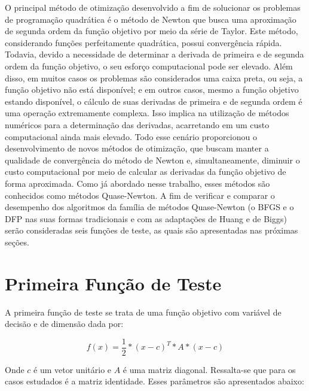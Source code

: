 O principal método de otimização desenvolvido a fim de solucionar os problemas de programação quadrática é o método de Newton que busca uma aproximação de segunda ordem da função objetivo por meio da série de Taylor. Este método, considerando funções perfeitamente quadrática, possui convergência rápida. Todavia, devido a necessidade de determinar a derivada de primeira e de segunda ordem da função objetivo, o seu esforço computacional pode ser elevado. Além disso, em muitos casos os problemas são considerados uma caixa preta, ou seja, a função objetivo não está disponível; e em outros casos, mesmo a função objetivo estando disponível, o cálculo de suas derivadas de primeira e de segunda ordem é uma operação extremamente complexa. Isso implica na utilização de métodos numéricos para a determinação das derivadas, acarretando em um custo computacional ainda mais elevado.
Todo esse cenário proporcionou o desenvolvimento de novos métodos de otimização, que buscam manter a qualidade de convergência do método de Newton e, simultaneamente, diminuir o custo computacional por meio de calcular as derivadas da função objetivo de forma aproximada. Como já abordado nesse trabalho, esses métodos são conhecidos como métodos Quase-Newton.
A fim de verificar e comparar o desempenho dos algoritmos da família de métodos Quase-Newton (o BFGS e o DFP nas suas formas tradicionais e com as adaptações de Huang e de Biggs) serão consideradas seis funções de teste, as quais são apresentadas nas próximas seções.

\section{Primeira Função de Teste}\label{sec:prifun}

A primeira função de teste se trata de uma função objetivo com variável de decisão e de dimensão dada por:

\begin{equation}\label{eq:prifuntst}
  f(x)= \frac{1}{2}*(x-c)^{T}*A*(x-c)
\end{equation}

Onde $c$ é um vetor unitário e $A$ é uma matriz diagonal. Ressalta-se que para os casos estudados é a matriz identidade. Esses parâmetros são apresentados abaixo:

